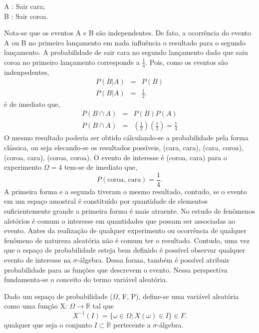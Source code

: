    \vspace{0.5cm}
   \hspace{4cm}
   \begin{minipage}{9cm} 
	   A : Sair cara; \\ B : Sair coroa. \\ 
   \end{minipage}
Nota-se que os eventos A e B s\~{a}o independentes. De fato, a ocorr\^{e}ncia do evento A ou B no primeiro
lan\c{c}amento em nada influ\^{e}ncia o resultado para o segundo lan\c{c}amento. A probabilidade de sair
 cara no segundo lan\c{c}amento dado que saiu coroa no primeiro lan\c{c}amento corresponde a $\frac {1}
   {4}$.  Pois, como os eventos s\~{a}o indenpedentes, 
   \begin{eqnarray*}
	   P(B|A) &=& P(B) \\ \nonumber P(B|A)
	   &=&  \frac{1} {2}. \nonumber 
   \end{eqnarray*} \'{e} de imediato que, 
   \begin{eqnarray*} P(B \cap A ) &=&
	   P(B)P(A) \\ P(B \cap A) &=&  \left( \frac{1} {2}  \right) \left( \frac{1} {2}  \right) = \frac{1} {4}
   \end{eqnarray*} 
O mesmo resultado poderia ser obtido c\'{a}lculando-se a probabilidade pela forma
cl\'{a}ssica, ou seja elecando-se os resultados poss\'iveis, (cara, cara), (cara, coroa), (coroa, cara),
(coroa, coroa).  O evento de interesse \'{e} (coroa, cara) para o experimento $\Omega = 4 $ tem-se de
imediato que, 
\begin{equation*}
	P( \textrm{coroa, cara}) = \frac {1} {4}. 
\end{equation*} A primeira forma
e a segunda tiveram o mesmo resultado, contudo, se o evento em um espa\c{c}o amostral \'e constitu\'ido por
quantidade de elementos suficientemente grande a primeira forma \'{e} mais atraente. No estudo de
fen\^{o}menos alet\'{o}rios \'{e} comum o interesse em quantidades que possam ser associadas ao evento.
Antes da realiza\c{c}\~{a}o de qualquer experimento ou ocorr\^{e}ncia de qualquer fen\^{o}meno de natureza
aleat\'{o}ria n\~{a}o \'{e} comum ter o resultado. Contudo, uma vez que o espa\c{c}o de probabilidade
esteja bem definido \'{e} poss\'{i}vel observar qualquer evento de interesse na $\sigma$-\'{a}lgebra. Dessa
forma, tamb\'{e}m \'{e} poss\'{i}vel atribuir probabilidade para as fun\c{c}\~{o}es que descrevem o evento.
   Nessa perspectiva fundamenta-se o conceito do termo vari\'{a}vel aleat\'{o}ria.  
	\begin{defin} Dado um espa\c{c}o de probabilidade ($\Omega$, F, P), define-se uma vari\'{a}vel
	aleat\'{o}ria como uma fun\c{c}\~{a}o X: $\Omega \rightarrow \mathbb{R}$ tal que 
		\begin{equation*}
		 	\label{v.a}
		  	X^{-1}(I) = \{ \omega \in \Omega; X(\omega) \in I \} \in F.  
		\end{equation*} 
	qualquer que seja o conjunto $I \subset \mathbb{R}$ pertecente a $\sigma$-\'{a}lgebra.  
	\end{defin}
